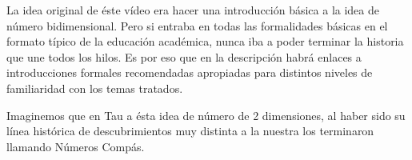 \documentclass[preview]{standalone}
\begin{document}
\begin{center}
La idea original de éste vídeo era hacer una introducción básica a la idea de número bidimensional. Pero si entraba en todas las formalidades básicas en el formato típico  de la educación académica, nunca iba a poder terminar la historia que une todos los hilos. Es por eso que en la descripción habrá enlaces a introducciones formales recomendadas apropiadas para distintos niveles de familiaridad con los temas tratados. 

Imaginemos que en Tau a ésta idea de número de 2 dimensiones, al haber sido su línea histórica de descubrimientos muy distinta a la nuestra los terminaron llamando Números Compás.
\end{center}
\end{document}
